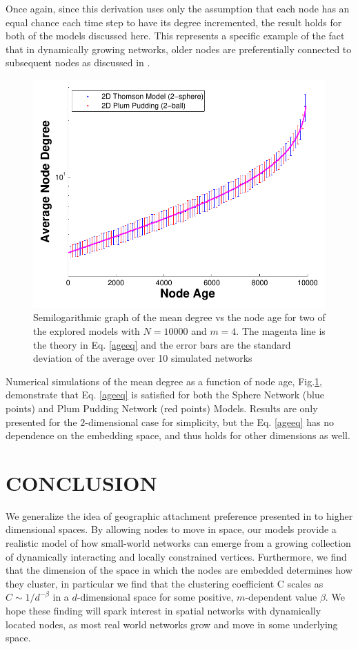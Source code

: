 \documentclass[aps,pre,reprint,superscriptaddress,amsmath,amssymb,nofootinbib]{revtex4-1}
\begin{document}
Once again, since this derivation uses only the assumption that each node has an equal chance each time step to have its degree incremented, the result holds for both of the models discussed here.
This represents a specific example of the fact that in dynamically growing networks, older nodes are preferentially connected to subsequent nodes as discussed in \cite{reallyrandom}.
\begin{figure}
\includegraphics[width=\linewidth]{figures/figDvsAge.pdf}
\caption{\label{degage}Semilogarithmic graph of the mean degree vs the node age for two of the explored models with $N = 10000$ and $m = 4$. The magenta line is the theory in Eq. \eqref{ageeq} and the error bars are the standard deviation of the average over 10 simulated networks}
\end{figure}
Numerical simulations of the mean degree as a function of node age, Fig.\ref{degage}, demonstrate that Eq. \eqref{ageeq} is satisfied for both the Sphere Network (blue points) and Plum Pudding Network (red points) Models.
Results are only presented for the $2$-dimensional case for simplicity, but the Eq. \eqref{ageeq} has no dependence on the embedding space, and thus holds for other dimensions as well.

\section{CONCLUSION}
We generalize the idea of geographic attachment preference presented in \cite{ozik2004} to higher dimensional spaces.
By allowing nodes to move in space, our models provide a realistic model of how small-world networks can emerge from a growing collection of dynamically interacting and locally constrained vertices.  
Furthermore, we find that the dimension of the space in which the nodes are embedded determines how they cluster, in particular we find that the clustering coefficient C scales as $C \sim 1/d^{-\beta}$ in a $d$-dimensional space for some positive, $m$-dependent value $\beta$.
We hope these finding will spark interest in spatial networks with dynamically located nodes, as most real world networks grow and move in some underlying space.
\end{document}
